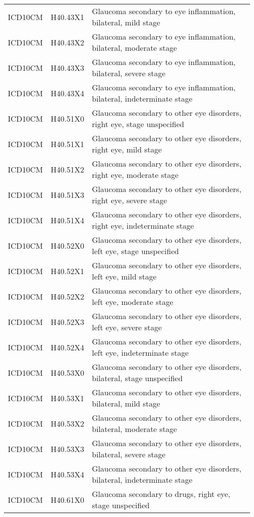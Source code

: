 \begin{longtable}{p{}p{}p{}}
  ICD10CM & H40.43X1 & Glaucoma secondary to eye inflammation, bilateral, mild stage \\ 
  ICD10CM & H40.43X2 & Glaucoma secondary to eye inflammation, bilateral, moderate stage \\ 
  ICD10CM & H40.43X3 & Glaucoma secondary to eye inflammation, bilateral, severe stage \\ 
  ICD10CM & H40.43X4 & Glaucoma secondary to eye inflammation, bilateral, indeterminate stage \\ 
  ICD10CM & H40.51X0 & Glaucoma secondary to other eye disorders, right eye, stage unspecified \\ 
  ICD10CM & H40.51X1 & Glaucoma secondary to other eye disorders, right eye, mild stage \\ 
  ICD10CM & H40.51X2 & Glaucoma secondary to other eye disorders, right eye, moderate stage \\ 
  ICD10CM & H40.51X3 & Glaucoma secondary to other eye disorders, right eye, severe stage \\ 
  ICD10CM & H40.51X4 & Glaucoma secondary to other eye disorders, right eye, indeterminate stage \\ 
  ICD10CM & H40.52X0 & Glaucoma secondary to other eye disorders, left eye, stage unspecified \\ 
  ICD10CM & H40.52X1 & Glaucoma secondary to other eye disorders, left eye, mild stage \\ 
  ICD10CM & H40.52X2 & Glaucoma secondary to other eye disorders, left eye, moderate stage \\ 
  ICD10CM & H40.52X3 & Glaucoma secondary to other eye disorders, left eye, severe stage \\ 
  ICD10CM & H40.52X4 & Glaucoma secondary to other eye disorders, left eye, indeterminate stage \\ 
  ICD10CM & H40.53X0 & Glaucoma secondary to other eye disorders, bilateral, stage unspecified \\ 
  ICD10CM & H40.53X1 & Glaucoma secondary to other eye disorders, bilateral, mild stage \\ 
  ICD10CM & H40.53X2 & Glaucoma secondary to other eye disorders, bilateral, moderate stage \\ 
  ICD10CM & H40.53X3 & Glaucoma secondary to other eye disorders, bilateral, severe stage \\ 
  ICD10CM & H40.53X4 & Glaucoma secondary to other eye disorders, bilateral, indeterminate stage \\ 
  ICD10CM & H40.61X0 & Glaucoma secondary to drugs, right eye, stage unspecified \\ 

\end{longtable}
